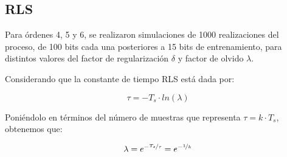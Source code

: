 \documentclass[main.tex]{subfiles}
\begin{document}
\subsection*{RLS}

Para \'ordenes 4, 5 y 6, se realizaron simulaciones de 1000
realizaciones del proceso, de 100 bits cada una posteriores a 15 bits de entrenamiento, para distintos valores del factor de regularizaci\'on $\delta$ y factor de olvido $\lambda$. 

Considerando que la constante de tiempo RLS est\'a dada por:

\begin{equation}
	\tau = -T_s \cdot ln(\lambda)
\end{equation}

Poni\'endolo en t\'erminos del n\'umero de muestras que representa $\tau = k \cdot T_s$, obtenemos que:

\begin{equation}
	\lambda = e^{-\nicefrac{T_s}{\tau}} = e^{-\nicefrac{1}{k}}
\end{equation}
\end{document}
